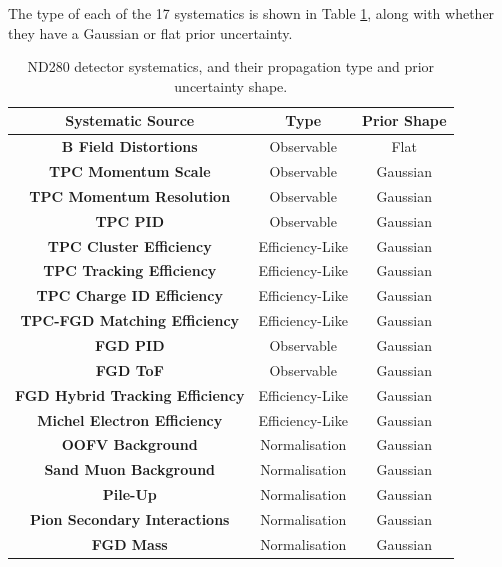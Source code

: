 The type of each of the 17 systematics is shown in Table \ref{tab:detsyst}, along with whether they have a Gaussian or flat prior uncertainty.

\begin{center}
\begin{table}
\center
\large
\begin{tabular}{ c||c|c}
\hline
\hline
\textbf{Systematic Source} & \textbf{Type} & \textbf{Prior Shape} \\
\hline
\hline
\textbf{B Field Distortions} & Observable & Flat \\ \hline
\textbf{TPC Momentum Scale} & Observable & Gaussian \\ \hline
\textbf{TPC Momentum Resolution} & Observable & Gaussian \\ \hline
\textbf{TPC PID} & Observable & Gaussian \\ \hline
\textbf{TPC Cluster Efficiency} & Efficiency-Like & Gaussian \\ \hline
\textbf{TPC Tracking Efficiency} & Efficiency-Like & Gaussian \\ \hline
\textbf{TPC Charge ID Efficiency} & Efficiency-Like & Gaussian \\ \hline
\textbf{TPC-FGD Matching Efficiency} & Efficiency-Like & Gaussian \\ \hline
\textbf{FGD PID} & Observable & Gaussian \\ \hline
\textbf{FGD ToF} & Observable & Gaussian \\ \hline
\textbf{FGD Hybrid Tracking Efficiency} & Efficiency-Like & Gaussian \\ \hline
\textbf{Michel Electron Efficiency} & Efficiency-Like & Gaussian \\ \hline
\textbf{OOFV Background} & Normalisation & Gaussian \\ \hline
\textbf{Sand Muon Background} & Normalisation & Gaussian \\ \hline
\textbf{Pile-Up} & Normalisation & Gaussian \\ \hline
\textbf{Pion Secondary Interactions} & Normalisation & Gaussian \\ \hline
\textbf{FGD Mass} & Normalisation & Gaussian \\ 
\hline
\hline
\end{tabular}
\caption{ND280 detector systematics, and their propagation type and prior uncertainty shape.}
\label{tab:detsyst}
\end{table}
\end{center}

